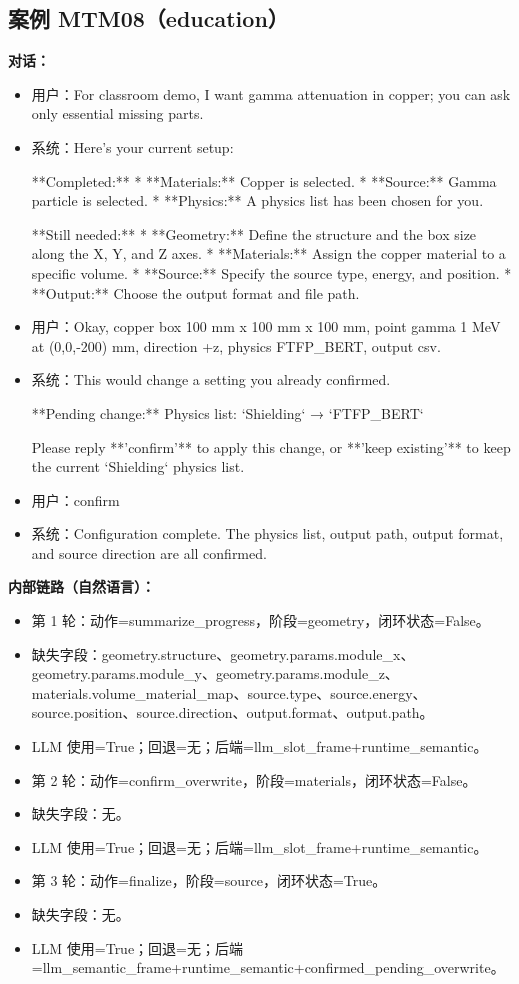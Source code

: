 \documentclass[11pt]{ctexart}
\begin{document}
\subsection{案例 MTM08（education）}
\textbf{对话：}
\begin{itemize}
\item 用户：For classroom demo, I want gamma attenuation in copper; you can ask only essential missing parts.
\item 系统：Here's your current setup:

**Completed:**
*   **Materials:** Copper is selected.
*   **Source:** Gamma particle is selected.
*   **Physics:** A physics list has been chosen for you.

**Still needed:**
*   **Geometry:** Define the structure and the box size along the X, Y, and Z axes.
*   **Materials:** Assign the copper material to a specific volume.
*   **Source:** Specify the source type, energy, and position.
*   **Output:** Choose the output format and file path.
\item 用户：Okay, copper box 100 mm x 100 mm x 100 mm, point gamma 1 MeV at (0,0,-200) mm, direction +z, physics FTFP\_BERT, output csv.
\item 系统：This would change a setting you already confirmed.

**Pending change:**
Physics list: `Shielding` → `FTFP\_BERT`

Please reply **'confirm'** to apply this change, or **'keep existing'** to keep the current `Shielding` physics list.
\item 用户：confirm
\item 系统：Configuration complete. The physics list, output path, output format, and source direction are all confirmed.
\end{itemize}
\textbf{内部链路（自然语言）：}
\begin{itemize}
\item 第 1 轮：动作=summarize\_progress，阶段=geometry，闭环状态=False。
\item 缺失字段：geometry.structure、geometry.params.module\_x、geometry.params.module\_y、geometry.params.module\_z、materials.volume\_material\_map、source.type、source.energy、source.position、source.direction、output.format、output.path。
\item LLM 使用=True；回退=无；后端=llm\_slot\_frame+runtime\_semantic。
\item 第 2 轮：动作=confirm\_overwrite，阶段=materials，闭环状态=False。
\item 缺失字段：无。
\item LLM 使用=True；回退=无；后端=llm\_slot\_frame+runtime\_semantic。
\item 第 3 轮：动作=finalize，阶段=source，闭环状态=True。
\item 缺失字段：无。
\item LLM 使用=True；回退=无；后端=llm\_semantic\_frame+runtime\_semantic+confirmed\_pending\_overwrite。
\end{itemize}
\end{document}
